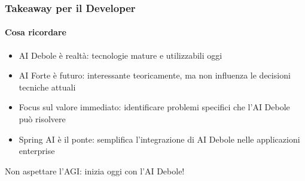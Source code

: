 %
\begin{frame}[t,fragile] \frametitle{Takeaway per il Developer}
	{\small
		\framesubtitle{Cosa ricordare}
		\begin{itemize}[leftmargin=10pt,align=right]
			\item[\alert{\faHandORight}] \alert{AI Debole è realtà:} tecnologie mature e utilizzabili oggi
			\item[\alert{\faHandORight}] \alert{AI Forte è futuro:} interessante teoricamente, ma non influenza le decisioni tecniche attuali
			\item[\alert{\faHandORight}] \alert{Focus sul valore immediato:} identificare problemi specifici che l'AI Debole può risolvere
			\item[\alert{\faHandORight}] \alert{Spring AI è il ponte:} semplifica l'integrazione di AI Debole nelle applicazioni enterprise
		\end{itemize}
		\vspace*{.5cm}
		\begin{center}
			\alert{\Large Non aspettare l'AGI: inizia oggi con l'AI Debole!}
		\end{center}
	}
\end{frame}
%